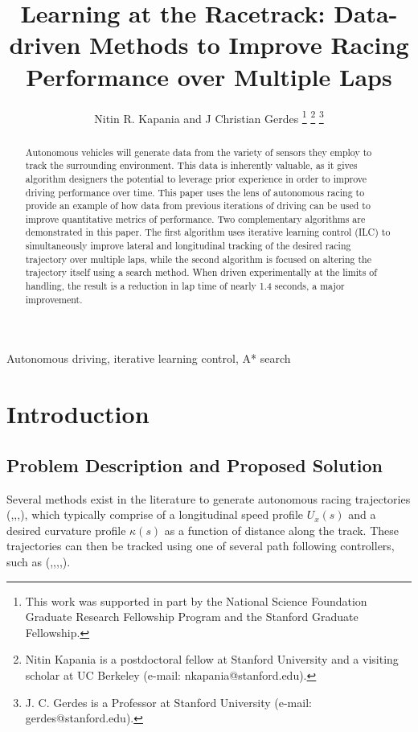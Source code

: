 \documentclass[9pt,shortpaper,twoside,web]{ieeecolor}
\begin{document}
\title{Learning at the Racetrack: Data-driven Methods to Improve Racing Performance over Multiple Laps}
\author{Nitin R. Kapania and J Christian Gerdes
\thanks{This work was supported in part by the National Science Foundation Graduate Research Fellowship Program and the Stanford Graduate Fellowship. }
\thanks{Nitin Kapania is a postdoctoral fellow at Stanford University and a visiting scholar at UC Berkeley (e-mail: nkapania@stanford.edu).}
\thanks{J. C. Gerdes is a Professor 
at Stanford University (e-mail: gerdes@stanford.edu).}}

\maketitle

\begin{abstract}
Autonomous vehicles will generate data from the variety of sensors they employ to track the surrounding environment. This data is inherently valuable, as it gives algorithm designers the potential to leverage prior experience in order to improve driving performance over time. This paper uses the lens of autonomous racing to provide an example of how data from previous iterations of driving can be used to improve quantitative metrics of performance. Two complementary algorithms are demonstrated in this paper. The first algorithm uses iterative learning control (ILC) to simultaneously improve lateral and longitudinal tracking of the desired racing trajectory over multiple laps, while the second algorithm is focused on altering the trajectory itself using a search method. When driven experimentally at the limits of handling, the result is a reduction in lap time of nearly 1.4 seconds, a major improvement.    

\end{abstract}

\begin{IEEEkeywords}
 Autonomous driving, iterative learning control, A* search
\end{IEEEkeywords}

\section{Introduction}
\label{sec:introduction}

\subsection{Problem Description and Proposed Solution}
Several methods exist in the literature to generate autonomous racing trajectories 
(\cite{casanova},\cite{kelly},\cite{theodosis},\cite{kapaniadscc}), which typically comprise of a longitudinal speed profile $U_x(s)$ and a desired curvature profile $\kappa(s)$ as a function of distance along the track. These trajectories can then be tracked using one of several path following controllers, such as (\cite{mickcop},\cite{fricStudy},\cite{mickgeneral},\cite{shladover},\cite{nagai}). 
\end{document}
